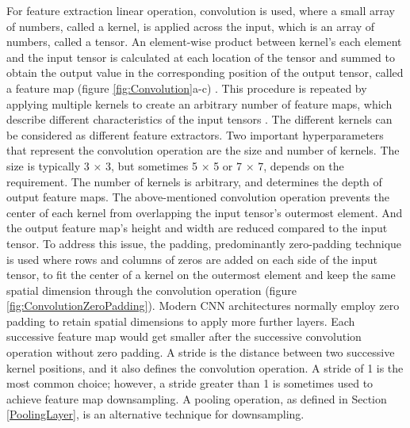 For feature extraction linear operation, convolution is used, where a small array of numbers, called a kernel, is applied across the input, which is an array of numbers, called a tensor. An element-wise product between kernel's each element and the input tensor is calculated at each location of the tensor and summed to obtain the output value in the corresponding position of the output tensor, called a feature map (figure \ref{fig:Convolution}a-c) \cite{articleCNNs}. 
This procedure is repeated by applying multiple kernels to create an arbitrary number of feature maps, which describe different characteristics of the input tensors \cite{articleCNNs}. The different kernels can be considered as different feature extractors. Two important hyperparameters that represent the convolution operation are the size and number of kernels. The size is typically 3 × 3, but sometimes 5 × 5 or 7 × 7, depends on the requirement. The number of kernels is arbitrary, and determines the depth of output feature maps. The above-mentioned convolution operation prevents the center of each kernel from overlapping the input tensor's outermost element. And the output feature map's height and width are reduced compared to the input tensor. To address this issue, the padding, predominantly zero-padding technique is used where rows and columns of zeros are added on each side of the input tensor, to fit the center of a kernel on the outermost element and keep the same spatial dimension through the convolution operation (figure \ref{fig:ConvolutionZeroPadding}). Modern \ac{CNN} architectures normally employ zero padding to retain spatial dimensions to apply more further layers. Each successive feature map would get smaller after the successive convolution operation without zero padding. A stride is the distance between two successive kernel positions, and it also defines the convolution operation. A stride of 1 is the most common choice; however, a stride greater than 1 is sometimes used to achieve feature map downsampling. A pooling operation, as defined in Section \ref{PoolingLayer}, is an alternative technique for downsampling. 


